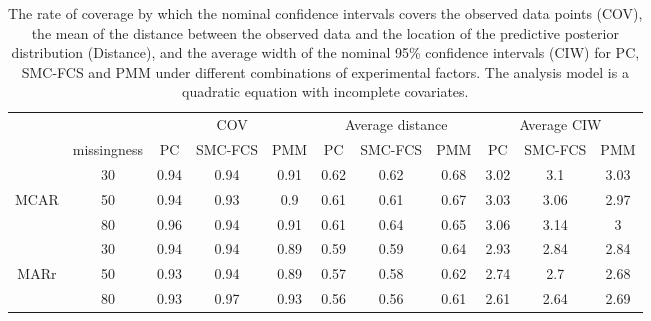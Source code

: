 \documentclass[12pt, fullpage, a4paper]{article}
\begin{document}
\begin{table}
	\begin{tabular}{cc|ccc|ccc|ccc}
		\multicolumn{2}{l}{}                    & \multicolumn{3}{c|}{COV} & \multicolumn{3}{c|}{Average distance} & \multicolumn{3}{c}{Average CIW} \\ \cline{2-11} 
		\multicolumn{1}{c|}{}     & missingness & PC    & SMC-FCS  & PMM   & PC         & SMC-FCS      & PMM       & PC       & SMC-FCS    & PMM     \\
		\multicolumn{1}{c|}{}     & 30          & 0.94  & 0.94     & 0.91  & 0.62       & 0.62         & 0.68      & 3.02     & 3.1        & 3.03    \\
		\multicolumn{1}{c|}{MCAR} & 50          & 0.94  & 0.93     & 0.9   & 0.61       & 0.61         & 0.67      & 3.03     & 3.06       & 2.97    \\
		\multicolumn{1}{c|}{}     & 80          & 0.96  & 0.94     & 0.91  & 0.61       & 0.64         & 0.65      & 3.06     & 3.14       & 3       \\ \hline
		\multicolumn{1}{c|}{}     & 30          & 0.94  & 0.94     & 0.89  & 0.59       & 0.59         & 0.64      & 2.93     & 2.84       & 2.84    \\
		\multicolumn{1}{c|}{MARr} & 50          & 0.93  & 0.94     & 0.89  & 0.57       & 0.58         & 0.62      & 2.74     & 2.7        & 2.68    \\
		\multicolumn{1}{c|}{}     & 80          & 0.93  & 0.97     & 0.93  & 0.56       & 0.56         & 0.61      & 2.61     & 2.64       & 2.69   
	\end{tabular}
	\caption{The rate of coverage by which the nominal confidence intervals covers the observed data points (COV), the mean of the distance between the observed data and the location of the predictive posterior distribution (Distance), and the average width of the nominal 95\% confidence intervals (CIW) for PC, SMC-FCS and PMM under different combinations of experimental factors. The analysis model is a quadratic equation with incomplete covariates.}
	\label{tab6_2}
\end{table}
\end{document}
